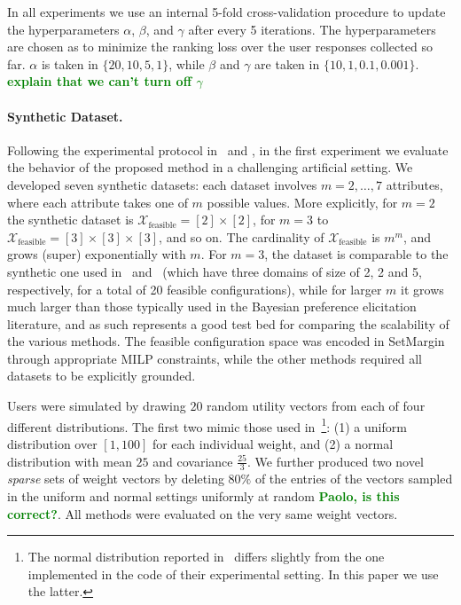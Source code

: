 \documentclass{article}
\renewcommand\[{\begin{equation}}
\renewcommand\]{\end{equation}}
\newcommand{\calvar}[1]{\ensuremath{\mathcal{#1}}}
\newcommand{\calX}{\calvar{X}}
\newcommand{\stefano}[1]{{\bf \textcolor{green}{{\fbox{Stefano:} #1}}}}
\begin{document}
In all experiments we use an internal 5-fold cross-validation procedure to
update the hyperparameters $\alpha$, $\beta$, and $\gamma$ after every 5
iterations. The hyperparameters are chosen as to minimize the ranking loss over
the user responses collected so far. $\alpha$ is taken in $\{20, 10, 5, 1\}$,
while $\beta$ and $\gamma$ are taken in $\{10, 1, 0.1, 0.001\}$.
\stefano{explain that we can't turn off $\gamma$}

\paragraph{Synthetic Dataset.} Following the experimental protocol
in~\cite{guo2010real} and \cite{viappiani2010optimal}, in the first experiment
we evaluate the behavior of the proposed method in a challenging artificial
setting. We developed seven synthetic datasets: each dataset involves
$m=2,\ldots,7$ attributes, where each attribute takes one of $m$ possible
values. More explicitly, for $m=2$ the synthetic dataset is
$\calX_\text{feasible} = [2] \times [2]$, for $m=3$ to $\calX_\text{feasible} =
[3] \times [3] \times [3]$, and so on. The cardinality of
$\calX_\text{feasible}$ is $m^m$, and grows (super) exponentially with $m$. For
$m=3$, the dataset is comparable to the synthetic one used
in~\cite{guo2010real} and~\cite{viappiani2010optimal} (which have three domains
of size of 2, 2 and 5, respectively, for a total of 20 feasible
configurations), while for larger $m$ it grows much larger than those typically
used in the Bayesian preference elicitation literature, and as such represents
a good test bed for comparing the scalability of the various methods.
The feasible configuration space was encoded in {\sc SetMargin} through
appropriate MILP constraints, while the other methods required all datasets to
be explicitly grounded.

Users were simulated by drawing $20$ random utility vectors from each of four
different distributions. The first two mimic those used
in~\cite{guo2010real}\footnote{The normal distribution reported
in~\cite{guo2010real} differs slightly from the one implemented in the code of
their experimental setting. In this paper we use the latter.}:
(1) a uniform distribution over $[1, 100]$ for each individual weight, and (2)
a normal distribution with mean $25$ and covariance
$\frac{25}{3}$.  We further produced two novel
{\em sparse} sets of weight vectors by deleting $80\%$ of the entries of the
vectors sampled in the uniform and normal settings uniformly at random
\stefano{Paolo, is this correct?}. All methods were evaluated on the very same
weight vectors.
\end{document}
